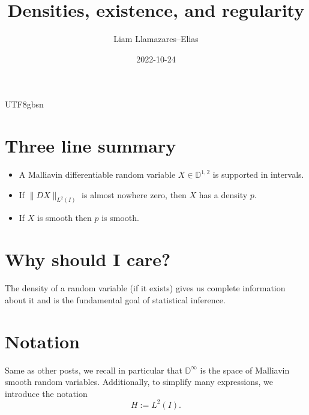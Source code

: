 \documentclass[12pt]{article}
\begin{document}
\begin{CJK*}{UTF8}{gbsn}
	\title{Densities, existence, and regularity}
	\author{Liam Llamazares--Elias}
	\date{2022-10-24}
	\maketitle
	\section{ Three line summary}
	\begin{itemize}
		\item A Malliavin differentiable random variable $X\in \mathbb{D}^{1,2}$ is supported in intervals.
		\item If $\|DX\|_{L^2(I)}$ is almost nowhere zero, then  $X$ has a density  $p$.
		\item If  $X$ is smooth then  $p$ is smooth.
	\end{itemize}
	\section{Why should I care?}
	The density of a random variable (if it exists) gives us complete information about it and is the fundamental goal of statistical inference.
	\section{Notation}
	Same as other posts, we recall in particular that $\mathbb{D}^\infty$ is the space of Malliavin smooth random variables. Additionally, to simplify many expressions, we  introduce the notation
	\begin{equation*}
		H:=L^2(I).
	\end{equation*}


\end{CJK*}
\end{document}
